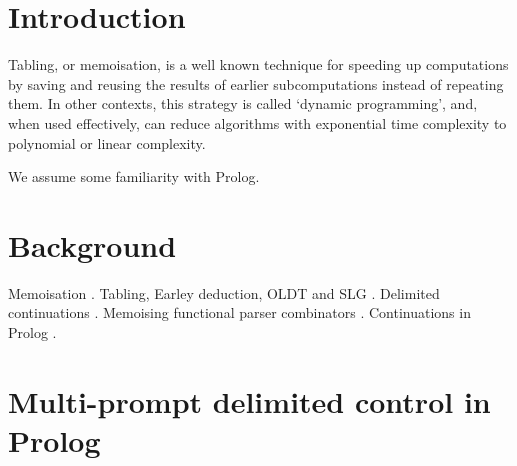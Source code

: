 
\section{Introduction}

Tabling, or memoisation, is a well known technique for speeding up computations
by saving and reusing the results of earlier subcomputations instead of repeating
them. In other contexts, this strategy is called `dynamic programming', and, when
used effectively, can reduce algorithms with exponential time complexity to polynomial
or linear complexity.

We assume some familiarity with Prolog.

\section{Background}

Memoisation
\cite{Michie1968}.
Tabling, Earley deduction, OLDT and SLG
\cite{Earley1970,Warren1975,PereiraWarren1980,Porter1986,TamakiSato1986}.
Delimited continuations \cite{Felleisen1988,DanvyFilinski1990,Filinski1999,Shan2004,KiselyovShan2009,Kiselyov2012}.
Memoising functional parser combinators \cite{Norvig1991,Lindgren1994,Johnson1995}.
Continuations in Prolog \cite{TarauNeumerkel1994,TarauDahl1998,Neumerkel1995,SchrijversDemoenDesouter2013,DesouterVan-DoorenSchrijvers2015}.

\section{Multi-prompt delimited control in Prolog}

